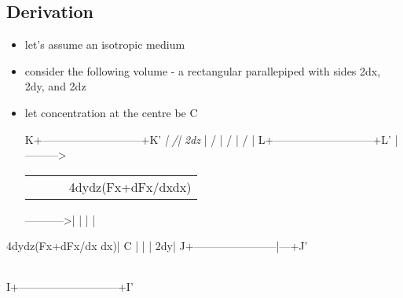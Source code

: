 \documentclass[11pt]{article}
\begin{document}
\subsection{Derivation}
\label{sec:org38a6280}
\begin{itemize}
\item let's assume an isotropic medium
\item consider the following volume - a rectangular parallepiped with sides 2dx, 2dy, and 2dz
\item let concentration at the centre be C

    K+---------------------------+K'
    \emph{|                          /|
2dz} |                         / |
  /  |                        /  |
L+---------------------------+L' |---------> 
\begin{center}
\begin{tabular}{llll}
 &  &  & 4dydz(Fx+dFx/dxdx)\\
\end{tabular}
\end{center}
----------->|   |                       |   |
\end{itemize}
4dydz(Fx+dFx/dx dx)| C |                       |   |
                2dy|  J+-----------------------|---+J'
\begin{center}
\begin{tabular}{}
\end{tabular}
\end{center}
I+---------------------------+I'
\end{document}
